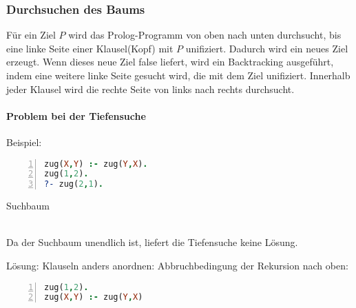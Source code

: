 \documentclass[a4paper]{scrartcl}
\begin{document}
\subsubsection{Durchsuchen des Baums} Für ein Ziel $P$ wird das Prolog-Programm von oben nach unten durchsucht, bis eine linke Seite einer Klausel(Kopf) mit $P$ unifiziert. Dadurch wird ein neues Ziel erzeugt. Wenn dieses neue Ziel false liefert, wird ein Backtracking ausgeführt, indem eine weitere linke Seite gesucht wird, die mit dem Ziel unifiziert. Innerhalb jeder Klausel wird die rechte Seite von links nach rechts durchsucht.
\paragraph{Problem bei der Tiefensuche}
Beispiel: 
\begin{lstlisting}[numbers=left, tabsize=4, language=Prolog]
zug(X,Y) :- zug(Y,X).
zug(1,2).
?- zug(2,1).
\end{lstlisting}
Suchbaum\\
\\
Da der Suchbaum unendlich ist, liefert die Tiefensuche keine Lösung.

Lösung: Klauseln anders anordnen: Abbruchbedingung der Rekursion nach oben:
\begin{lstlisting}[numbers=left, tabsize=4, language=Prolog]
zug(1,2).
zug(X,Y) :- zug(Y,X)
\end{lstlisting}
\end{document}
